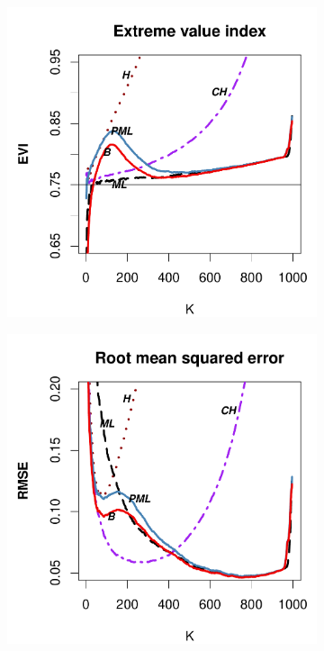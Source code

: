 \begin{figure}[h]
\begin{subfigure}[h]{0.40\linewidth}
		\end{subfigure}
		\bigskip
		\centering
		\begin{subfigure}[h]{0.40\linewidth}
			\includegraphics[width=\textwidth]{./plots/paper1/EVI_Outputburr0,751000.pdf}
		\end{subfigure}
		\hspace{\fill}
		\begin{subfigure}[h]{0.40\linewidth}
			\includegraphics[width=\textwidth]{./plots/paper1/RMSE_Outputburr0,751000.pdf}

\end{subfigure}
\end{figure}
